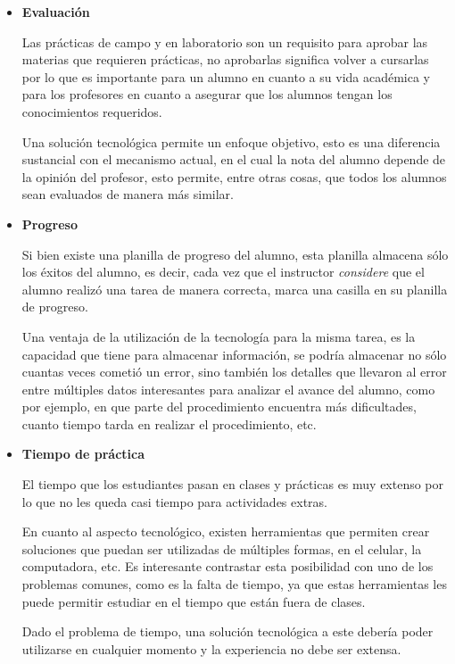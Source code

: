 \begin{itemize}

\item \textbf{Evaluación}
    
    Las prácticas de campo y en laboratorio son un requisito para aprobar las
    materias que requieren prácticas, no aprobarlas significa volver a cursarlas
    por lo que es importante para un alumno en cuanto a su vida académica y para
    los profesores en cuanto a asegurar que los alumnos tengan los conocimientos
    requeridos.
    
    Una solución tecnológica permite un enfoque objetivo, esto es una diferencia
    sustancial con el mecanismo actual, en el cual la nota del alumno depende de
    la opinión del profesor, esto permite, entre otras cosas, que todos los
    alumnos sean evaluados de manera más similar.
    
\item \textbf{Progreso}

    Si bien existe una planilla de progreso del alumno, esta planilla almacena
    sólo los éxitos del alumno, es decir, cada vez que el instructor
    \emph{considere} que el alumno realizó una tarea de manera correcta, marca
    una casilla en su planilla de progreso.

    Una ventaja de la utilización de la tecnología para la misma tarea, es la
    capacidad que tiene para almacenar información, se podría almacenar no sólo
    cuantas veces cometió un error, sino también los detalles que llevaron al
    error entre múltiples datos interesantes para analizar el avance del alumno,
    como por ejemplo, en que parte del procedimiento encuentra más dificultades,
    cuanto tiempo tarda en realizar el procedimiento, etc.
    
\item \textbf{Tiempo de práctica}
     
    El tiempo que los estudiantes pasan en clases y prácticas es muy extenso por
    lo que no les queda casi tiempo para actividades extras.
    
    En cuanto al aspecto tecnológico, existen herramientas que permiten crear
    soluciones que puedan ser utilizadas de múltiples formas, en el celular, la
    computadora, etc. Es interesante contrastar esta posibilidad con uno de los
    problemas comunes, como es la falta de tiempo, ya que estas herramientas les
    puede permitir estudiar en el tiempo que están fuera de clases.
    
    Dado el problema de tiempo, una solución tecnológica a este debería poder
    utilizarse en cualquier momento y la experiencia no debe ser extensa.


\end{itemize}
